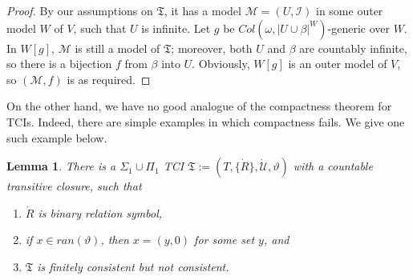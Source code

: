 \documentclass[12pt, twoside]{memoir}
\numberwithin{equation}{section}
\newtheorem{lem}[thm]{Lemma}
\theoremstyle{definition}
\theoremstyle{remark}
\theoremstyle{definition}
\theoremstyle{definition}
\theoremstyle{definition}
\theoremstyle{remark}
\begin{document}
\begin{proof}
By our assumptions on $\mathfrak{T}$, it has a model $\mathcal{M} = (U, \mathcal{I})$ in some outer model $W$ of $V$, such that $U$ is infinite. Let $g$ be $Col(\omega, |U \cup \beta|^W)$-generic over $W$. In $W[g]$, $\mathcal{M}$ is still a model of $\mathfrak{T}$; moreover, both $U$ and $\beta$ are countably infinite, so there is a bijection $f$ from $\beta$ into $U$. Obviously, $W[g]$ is an outer model of $V$, so $(\mathcal{M}, f)$ is as required.
\end{proof}

On the other hand, we have no good analogue of the compactness theorem for TCIs. Indeed, there are simple examples in which compactness fails. We give one such example below.

\begin{lem}\label{countercom}
There is a $\Sigma_1 \cup \Pi_1$ TCI $\mathfrak{T} := (T, \{\dot{R}\}, \dot{\mathcal{U}}, \vartheta)$ with a countable transitive closure, such that
\begin{enumerate}[label=(\alph*)]
    \item $\dot{R}$ is binary relation symbol, 
    \item if $x \in ran(\vartheta)$, then $x = (y, 0)$ for some set $y$, and
    \item $\mathfrak{T}$ is finitely consistent but not consistent.
\end{enumerate}
\end{lem}
\end{document}

